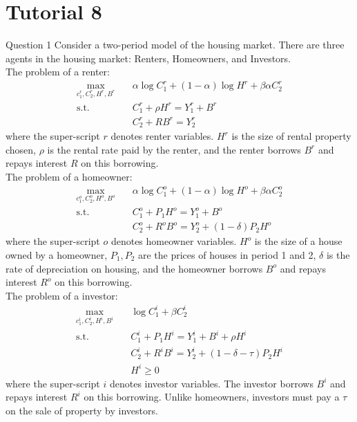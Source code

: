 \documentclass[a4paper]{article}
\newif\IfInSansMode
\begin{document}
\section{Tutorial 8}
	\begin{questionbox}{Question 1}
		Consider a two-period model of the housing market. There are three agents in the housing market: Renters, Homeowners, and Investors.\\
		The problem of a renter:
		\begin{align*}
			\max_{c_1^r,C_2^r,H^r,B^r}\quad &\alpha\log C_1^r + (1-\alpha)\log H^r + \beta\alpha C_2^r\\
			\text{s.t.}\quad &C_1^r + \rho H^r = Y_1^r + B^r\\
			&C_2^r + RB^r = Y_2^r
		\end{align*}
		where the super-script \( r \) denotes renter variables. \( H^r \) is the size of rental property chosen, \( \rho \) is the rental rate paid by the renter, and the renter borrows \( B^r \) and repays interest \( R \) on this borrowing.\\
		The problem of a homeowner:
		\begin{align*}
			\max_{c_1^o,C_2^o,H^o,B^o}\quad &\alpha\log C_1^o + (1-\alpha)\log H^o + \beta\alpha C_2^o\\
			\text{s.t.}\quad &C_1^o + P_1 H^o = Y_1^o + B^o\\
			&C_2^o + R^oB^o = Y_2^o + (1-\delta)P_2H^o
		\end{align*}
		where the super-script \( o \) denotes homeowner variables. \( H^o \) is the size of a house owned by a homeowner, \( P_1,P_2 \) are the prices of houses in period 1 and 2, \( \delta \) is the rate of depreciation on housing, and the homeowner borrows \( B^o \) and repays interest \( R^o \) on this borrowing.\\
		The problem of a investor:
		\begin{align*}
			\max_{c_1^i,C_2^i,H^i,B^i}\quad &\log C_1^i + \beta C_2^i\\
			\text{s.t.}\quad &C_1^i + P_1 H^i = Y_1^i + B^i + \rho H^i\\
			&C_2^i + R^iB^i = Y_2^i + (1-\delta-\tau)P_2H^i\\
			&H^i \geq 0
		\end{align*}
		where the super-script \( i \) denotes investor variables. The investor borrows \( B^i \) and repays interest \( R^i \) on this borrowing. Unlike homeowners, investors must pay a \( \tau \) on the sale of property by investors.
		\begin{enumerate}[(a)]

\end{enumerate}
\end{questionbox}
\end{document}
